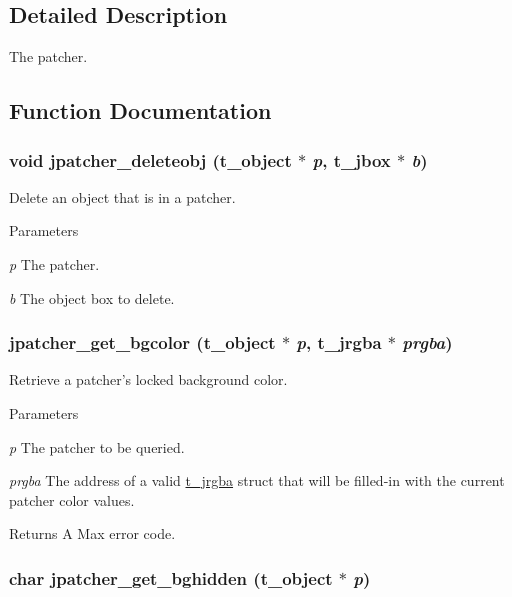 \subsection{Detailed Description}
The patcher. 

\subsection{Function Documentation}
\hypertarget{group__jpatcher_ga669798a90e3928a04b0f65143a7981fd}{
\subsubsection[{jpatcher\_\-deleteobj}]{\setlength{\rightskip}{0pt plus 5cm}void jpatcher\_\-deleteobj ({\bf t\_\-object} $\ast$ {\em p}, \/  {\bf t\_\-jbox} $\ast$ {\em b})}}
\label{group__jpatcher_ga669798a90e3928a04b0f65143a7981fd}


Delete an object that is in a patcher. 
\begin{DoxyParams}{Parameters}
\item[{\em p}]The patcher. \item[{\em b}]The object box to delete. \end{DoxyParams}
\hypertarget{group__jpatcher_gac08bdf16f3f65b962cdfbe2b5aa59ab0}{
\subsubsection[{jpatcher\_\-get\_\-bgcolor}]{ jpatcher\_\-get\_\-bgcolor ({\bf t\_\-object} $\ast$ {\em p}, \/  {\bf t\_\-jrgba} $\ast$ {\em prgba})}}
\label{group__jpatcher_gac08bdf16f3f65b962cdfbe2b5aa59ab0}


Retrieve a patcher's locked background color. 
\begin{DoxyParams}{Parameters}
\item[{\em p}]The patcher to be queried. \item[{\em prgba}]The address of a valid \hyperlink{structt__jrgba}{t\_\-jrgba} struct that will be filled-\/in with the current patcher color values. \end{DoxyParams}
\begin{DoxyReturn}{Returns}
A Max error code. 
\end{DoxyReturn}
\hypertarget{group__jpatcher_gabb79c4b3f29dd61ad9725a2a8141b312}{
\subsubsection[{jpatcher\_\-get\_\-bghidden}]{\setlength{\rightskip}{0pt plus 5cm}char jpatcher\_\-get\_\-bghidden ({\bf t\_\-object} $\ast$ {\em p})}}
\label{group__jpatcher_gabb79c4b3f29dd61ad9725a2a8141b312}


